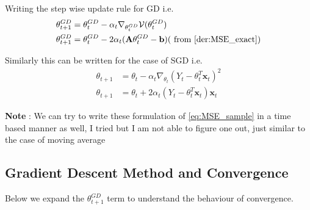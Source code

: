 \documentclass[twoside]{article}
\begin{document}
Writing the step wise update rule for GD i.e.
\begin{equation}
\begin{split}
    \theta_{t+1}^{GD} &= \theta_{t}^{GD} - \alpha_t \nabla_{\theta_t^{GD}}\mathcal{V}(\theta_t^{GD})\\
    \theta_{t+1}^{GD} &= \theta_{t}^{GD} - 2\alpha_t(\textbf{A}\theta_t^{GD} - \textbf{b}) \text{( from \ref{der:MSE_exact})}
    \end{split}
\end{equation}



Similarly this can be written for the case of SGD i.e.
\begin{equation}\label{eq:gradient_descent}
\begin{split}
    \theta_{t+1} &= \theta_t - \alpha_t\nabla_{\theta_t}(Y_t - \theta_t^T\textbf{x}_t)^2\\
    \theta_{t+1} &= \theta_t + 2\alpha_t(Y_t - \theta_t^T\textbf{x}_t)\textbf{x}_t
\end{split}
\end{equation}

\textbf{Note} : We can try to write these formulation of \ref{eq:MSE_sample} in a time based manner as well, I tried but I am not able to figure one out, just similar to the case of moving average


\subsection{Gradient Descent Method and Convergence}
Below we expand the $\theta_{t+1}^{GD}$ term to understand the behaviour of convergence.
\end{document}
